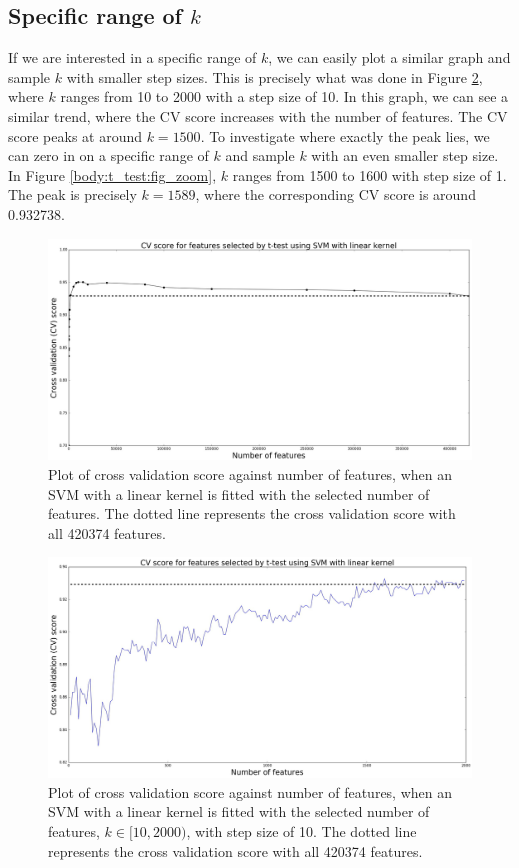 \documentclass[12pt, twoside, a4paper]{report}
\begin{document}
\subsection{Specific range of $k$}
If we are interested in a specific range of $k$, we can easily plot a similar graph and sample $k$ with smaller step sizes. This is precisely what was done in Figure \ref{body:t_test:fig}, where $k$ ranges from 10 to 2000 with a step size of 10. In this graph, we can see a similar trend, where the CV score increases with the number of features. The CV score peaks at around $k=1500$. To investigate where exactly the peak lies, we can zero in on a specific range of $k$ and sample $k$ with an even smaller step size. In Figure \ref{body:t_test:fig_zoom}, $k$ ranges from 1500 to 1600 with step size of 1. The peak is precisely $k=1589$, where the corresponding CV score is around 0.932738.


\begin{figure}
\centering
\includegraphics[width=\textwidth]{images/t_test_range.jpeg}
\caption{Plot of cross validation score against number of features, when an SVM with a linear kernel is fitted with the selected number of features. The dotted line represents the cross validation score with all 420374 features.}
\label{body:t_test:fig:range}
\end{figure}

\begin{figure}
\centering
\includegraphics[width=\textwidth]{images/t_test_2000_uneq_var1.jpeg}
\caption{Plot of cross validation score against number of features, when an SVM with a linear kernel is fitted with the selected number of features, $k \in [10, 2000)$, with step size of 10. The dotted line represents the cross validation score with all 420374 features.}
\label{body:t_test:fig}
\end{figure}
\end{document}
